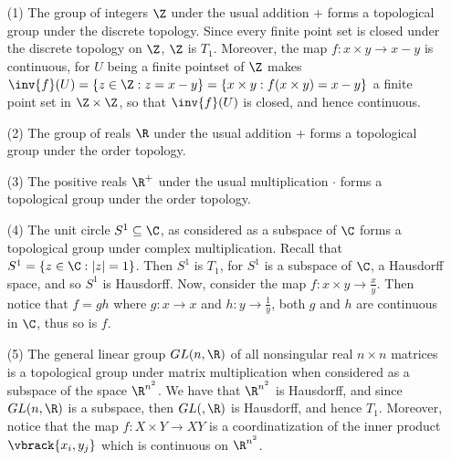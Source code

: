 \begin{example}\label{2.9}
    \begin{enumerate}
        \item[(1)] The group of integers $\Z$ under the usual addition $+$ forms
            a topological group under the discrete topology. Since every finite
            point set is closed under the discrete topology on $\Z$,  $\Z$
            is $T_1$. Moreover, the map $f:x \times y \rightarrow x-y$ is
            continuous, for $U$ being a finite pointset of $\Z$ makes
            $\inv{f}(U)=\{z \in \Z: z=x-y\}=\{x \times y : f(x \times y)=x-y\}$
            a finite point set in $\Z \times \Z$, so that  $\inv{f}(U)$ is
            closed, and hence continuous.

        \item[(2)] The group of reals $\R$ under the usual addition $+$ forms a
            topological group under the order topology.

        \item[(3)] The positive reals $\R^+$ under the usual multiplication
            $\cdot$ forms a topological group under the order topology.

        \item[(4)] The unit circle $S^1 \subseteq \C$, as considered as a
            subspace of  $\C$ forms a topological group under complex
            multiplication. Recall that $S^1=\{z \in \C : |z|=1\}$. Then $S^1$
            is  $T_1$, for $S^1$ is a subspace of $\C$, a Hausdorff space, and
            so  $S^1$ is Hausdorff. Now, consider the map  $f:x \times y
            \rightarrow \frac{x}{y}$. Then notice that $f=gh$ where  $g: x
            \rightarrow x$ and $h:y \rightarrow \frac{1}{y}$, both $g$ and  $h$
            are continuous in  $\C$, thus so is  $f$.

        \item[(5)] The general linear group $GL(n,\R)$ of all nonsingular real
            $n \times n$ matrices is a topological group under matrix
            multiplication when considered as a subspace of the space
            $\R^{n^2}$. We have that $\R^{n^2}$ is Hausdorff, and since
            $GL(n,\R)$ is a subspace, then $GL(,\R)$ is Hausdorff, and hence
            $T_1$. Moreover, notice that the map $f:X \times Y \rightarrow XY$
            is a coordinatization of the inner product $\vbrack{x_i,y_j}$ which
            is continuous on $\R^{n^2}$.
    \end{enumerate}
\end{example}

